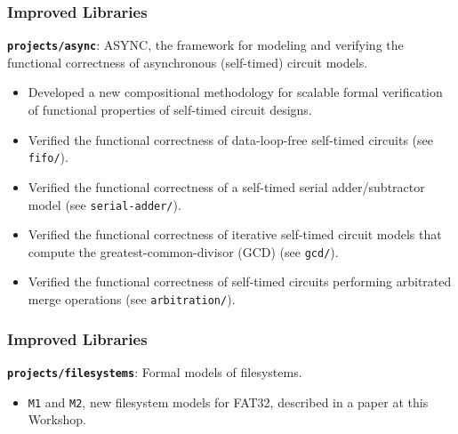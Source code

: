 \documentclass{beamer}
\newcommand{\code}[1]{\texttt{#1}}
\newcommand{\bookpath}[1]{\textbf{\code{#1}}}
\newcommand{\implibtitle}{\frametitle{Improved Libraries}}
\begin{document}
\begin{frame}

\implibtitle

\bookpath{projects/async}:
ASYNC, the framework for modeling and verifying the functional correctness
of asynchronous (self-timed) circuit models.
\begin{itemize}
\item
Developed a new compositional methodology for scalable formal
verification of functional properties of self-timed circuit designs.
\item
Verified the functional correctness of data-loop-free self-timed
circuits (see \code{fifo/}).
\item
Verified the functional correctness of a self-timed serial
adder/subtractor model (see \code{serial-adder/}).
\item
Verified the functional correctness of iterative self-timed circuit
models that compute the greatest-common-divisor (GCD) (see \code{gcd/}).
\item
Verified the functional correctness of self-timed circuits performing
arbitrated merge operations (see \code{arbitration/}).
\end{itemize}

\end{frame}


\begin{frame}

\implibtitle

\bookpath{projects/filesystems}:
Formal models of filesystems.
\begin{itemize}
\item
\texttt{M1} and \texttt{M2}, new filesystem models for FAT32,
described in a paper at this Workshop.
\end{itemize}

\end{frame}

\end{document}
